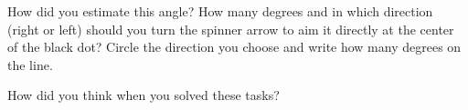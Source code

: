 \documentclass[12pt]{exam}
\begin{document}
\begin{questions}
\bigskip
How did you estimate this angle?
\newline
\newline
\newline
\underline{\hspace{\columnwidth}}
\newline
\newline
\underline{\hspace{\columnwidth}}
\pairspace
\newpage
\question How many degrees and in which direction (right or left) should you turn the spinner arrow to aim it directly at the center of the black dot? Circle the direction you choose and write how many degrees on the line.

\newcommand{\drawArrow}[2]{
	\draw #1 circle (0.07);
	\draw[->, line width=2pt, shift={($#1+(#2:0.07)$)}] (0,0) -- (#2:.7);
	\draw[shift={($#1+(#2:-0.07)$)}, line width=2pt] (0,0) -- (#2+180:.7);
}

\newcommand{\drawArrorChoice}[1]{
	\node at ($#1+(0,0.5)$) {LEFT / RIGHT};
	\node at ($#1$) {How many degrees?};
	\node at ($#1+(0,-0.5)$) {\underline{\hspace{2cm}}};
}


How did you think when you solved these tasks?
\newline
\newline
\newline
\underline{\hspace{\columnwidth}}
\newline
\newline
\underline{\hspace{\columnwidth}}
\pairspace



\end{questions}
\end{document}
